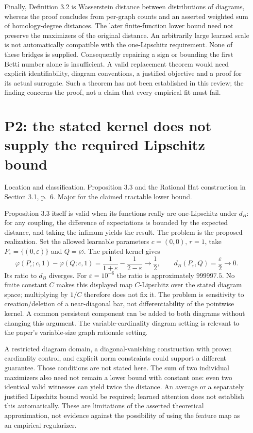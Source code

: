 \documentclass[10pt]{article}
\begin{document}
Finally, Definition 3.2 is Wasserstein distance between distributions of diagrams, whereas the proof concludes from per-graph counts and an asserted weighted sum of homology-degree distances. The later finite-function lower bound need not preserve the maximizers of the original distance. An arbitrarily large learned scale is not automatically compatible with the one-Lipschitz requirement. None of these bridges is supplied. Consequently repairing a sign or bounding the first Betti number alone is insufficient. A valid replacement theorem would need explicit identifiability, diagram conventions, a justified objective and a proof for its actual surrogate. Such a theorem has not been established in this review; the finding concerns the proof, not a claim that every empirical fit must fail.\par
\section*{P2: the stated kernel does not supply the required Lipschitz bound}
Location and classification. Proposition 3.3 and the Rational Hat construction in Section 3.1, p. 6. Major for the claimed tractable lower bound.\par
Proposition 3.3 itself is valid when its functions really are one-Lipschitz under \(d_B\): for any coupling, the difference of expectations is bounded by the expected distance, and taking the infimum yields the result. The problem is the proposed realization. Set the allowed learnable parameters \(c=(0,0)\), \(r=1\), take \(P_\varepsilon=\{(0,\varepsilon)\}\) and \(Q=\varnothing\). The printed kernel gives \[\varphi(P_\varepsilon;c,1)-\varphi(Q;c,1)
 =\frac1{1+\varepsilon}-\frac1{2-\varepsilon}
 \longrightarrow\frac12,
 \qquad d_B(P_\varepsilon,Q)=\frac{\varepsilon}{2}\longrightarrow0.\] Its ratio to \(d_B\) diverges. For \(\varepsilon=10^{-6}\) the ratio is approximately \(999997.5\). No finite constant \(C\) makes this displayed map \(C\)-Lipschitz over the stated diagram space; multiplying by \(1/C\) therefore does not fix it. The problem is sensitivity to creation/deletion of a near-diagonal bar, not differentiability of the pointwise kernel. A common persistent component can be added to both diagrams without changing this argument. The variable-cardinality diagram setting is relevant to the paper’s variable-size graph rationale setting.\par
A restricted diagram domain, a diagonal-vanishing construction with proven cardinality control, and explicit norm constraints could support a different guarantee. Those conditions are not stated here. The sum of two individual maximizers also need not remain a lower bound with constant one: even two identical valid witnesses can yield twice the distance. An average or a separately justified Lipschitz bound would be required; learned attention does not establish this automatically. These are limitations of the asserted theoretical approximation, not evidence against the possibility of using the feature map as an empirical regularizer.\par
\end{document}
